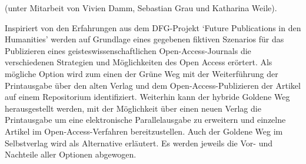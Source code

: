 (unter Mitarbeit von Vivien Damm, Sebastian Grau und Katharina Weile).

Inspiriert von den Erfahrungen aus dem DFG-Projekt `Future Publications
in den Humanities' werden auf Grundlage eines gegebenen fiktiven
Szenarios für das Publizieren eines geisteswissenschaftlichen
Open-Access-Journals die verschiedenen Strategien und Möglichkeiten des
Open Access erörtert. Als mögliche Option wird zum einen der Grüne Weg
mit der Weiterführung der Printausgabe über den alten Verlag und dem
Open-Access-Publizieren der Artikel auf einem Repositorium
identifiziert. Weiterhin kann der hybride Goldene Weg herausgestellt
werden, mit der Möglichkeit über einen neuen Verlag die Printausgabe um
eine elektronische Parallelausgabe zu erweitern und einzelne Artikel im
Open-Access-Verfahren bereitzustellen. Auch der Goldene Weg im
Selbstverlag wird als Alternative erläutert. Es werden jeweils die Vor-
und Nachteile aller Optionen abgewogen.
